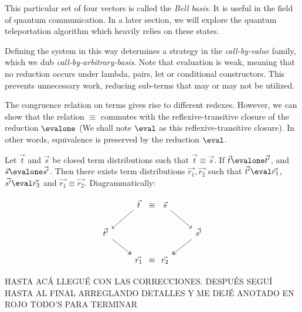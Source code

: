 This particular set of four vectors is called the \textit{Bell basis}. It is useful in the field of quantum communication. In a later section, we will explore the quantum teleportation algorithm which heavily relies on these states. 

Defining the system in this way determines a strategy in the \textit{call-by-value} family, which we dub \textit{call-by-arbitrary-basis}. Note that evaluation is weak, meaning that no reduction occurs under lambda, pairs, let or conditional constructors. This prevents unnecessary work, reducing sub-terms that may or may not be utilized.

The congruence relation on terms gives rise to different redexes. However, we can show that the relation $\equiv$ commutes with the reflexive-transitive closure of the reduction $\evalone$ (We shall note $\eval$ as this reflexive-transitive closure). In other words, equivalence is preserved by the reduction $\eval$.

\begin{theorem}
  Let $\vec{t}$ and $\vec{s}$ be closed term distributions such that $\vec{t}\equiv\vec{s}$. If $\vec{t}\evalone\vec{t'}$, and $\vec{s}\evalone\vec{s'}$. Then there exists term distributions $\vec{r_1},\vec{r_2}$ such that $\vec{t'}\eval\vec{r_1}$, $\vec{s'}\eval\vec{r_2}$ and $\vec{r_1}\equiv\vec{r_2}$. Diagrammatically:

\[
  \begin{tikzcd}
   & \vec{t} \arrow[ld]&[-2.5em] \equiv &[-2.5em] \vec{s}\arrow[rd] &\\
   \vec{t'}\arrow[dr, twoheadrightarrow] & & & & \vec{s'}\arrow[ld, twoheadrightarrow] \\
   & \vec{r_1} & \equiv & \vec{r_2} &
  \end{tikzcd}
\]
\end{theorem}

{\color{red} HASTA ACÁ LLEGUÉ CON LAS CORRECCIONES. DESPUÉS SEGUÍ HASTA AL FINAL ARREGLANDO DETALLES Y ME DEJÉ ANOTADO EN ROJO TODO'S PARA TERMINAR}


